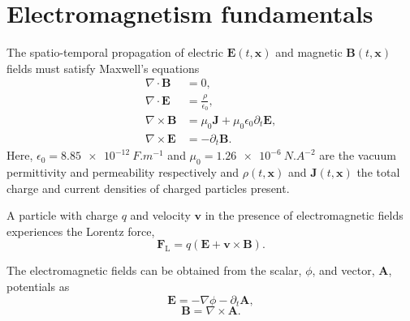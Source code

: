 \section{Electromagnetism fundamentals}
The spatio-temporal propagation of electric $\mathbf{E}(t,\mathbf{x})$ and magnetic $\mathbf{B}(t,\mathbf{x})$ fields must satisfy Maxwell's equations \cite{chenIntroductionPlasmaPhysics2016}
\begin{subequations}
	\label{eq:intro-maxwell}
	\begin{align}
		\nabla \cdot \mathbf{B} &= 0, \label{eq:intro-B0} \\
		\nabla \cdot \mathbf{E} &= \frac{\rho}{\epsilon_0},\label{eq:intro-E0} \\
		\nabla \times \mathbf{B} &= \mu_0 \mathbf{J} + \mu_0 \epsilon_0 \partial_t \mathbf{E},\label{eq:intro-B1} \\
		\nabla \times \mathbf{E} &=-\partial_t \mathbf{B}. \label{eq:intro-E1}
	\end{align}
\end{subequations}
Here, $\epsilon_0 = \qty{8.85e-12}{F.m^{-1}}$ and $\mu_0 = \qty{1.26e-6}{N.A^{-2}}$ are the vacuum permittivity and permeability respectively and $\rho(t,\mathbf{x})$ and $\mathbf{J}(t,\mathbf{x})$ the total charge and current densities of charged particles present. 

A particle with charge $q$ and velocity $\mathbf{v}$ in the presence of electromagnetic fields experiences the Lorentz force,
\begin{equation}\label{eq:intro-Lorentz_force}
	\mathbf{F}_\mathrm{L} = q(\mathbf{E} + \mathbf{v} \times \mathbf{B}).
\end{equation}

The electromagnetic fields can be obtained from the scalar, $\phi$, and vector, $\mathbf{A}$, potentials as  \cite{steaneRelativityMadeRelatively2012}
\begin{equation}
	\mathbf{E} = -\nabla \phi - \partial_t \mathbf{A},
\end{equation}
\begin{equation}
	\mathbf{B} = \nabla \times \mathbf{A}.
\end{equation}

